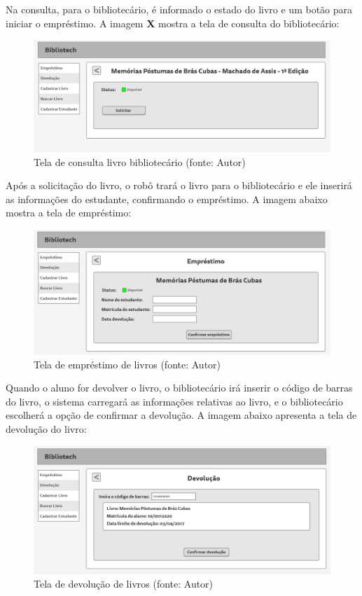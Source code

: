 Na consulta, para o bibliotecário, é informado o estado do livro e um botão para iniciar o empréstimo. A imagem \textbf{X} mostra a tela de consulta do bibliotecário:

\begin{figure}[!h]
\centering
\includegraphics[scale=0.40, angle = 360]{figuras/prototipo9}
\caption[]{Tela de consulta livro bibliotecário (fonte: Autor)}
\label{Tela de consulta livro bibliotecário}
\end{figure}
\FloatBarrier

Após a solicitação do livro, o robô trará o livro para o bibliotecário e ele inserirá as informações do estudante, confirmando o empréstimo. A imagem abaixo mostra a tela de empréstimo:

\begin{figure}[!h]
\centering
\includegraphics[scale=0.40, angle = 360]{figuras/prototipo10}
\caption[]{Tela de empréstimo de livros (fonte: Autor)}
\label{Tela de empréstimo de livros}
\end{figure}
\FloatBarrier

Quando o aluno for devolver o livro, o bibliotecário irá inserir o código de barras do livro, o sistema carregará as informações relativas ao livro, e o bibliotecário escolherá a opção de confirmar a devolução. A imagem abaixo apresenta a tela de devolução do livro:

\begin{figure}[!h]
\centering
\includegraphics[scale=0.40, angle = 360]{figuras/prototipo11}
\caption[]{Tela de devolução de livros (fonte: Autor)}
\label{Tela de devolução de livros}
\end{figure}
\FloatBarrier